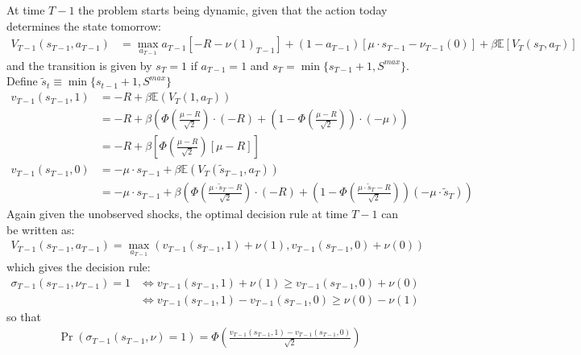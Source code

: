 \documentclass[english,letter,11pt,twoside]{article}
\begin{document}
At time $T-1$ the problem starts being dynamic, given that the action today determines the state tomorrow:
\begin{align*}
V_{T-1}(s_{T-1},a_{T-1}) &= \max_{a_{T-1}} a_{T-1}\left[ - R - \nu(1)_{T-1} \right] + (1 - a_{T-1}) \left[ \mu \cdot s_{T-1} - \nu_{T-1}(0) \right] + \beta \mathbb{E} \left[ V_T(s_T,a_T) \right]
\end{align*}
and the transition is given by $s_T = 1$ if $a_{T-1} = 1$ and $s_T = \min \{ s_{T-1}+1,S^{max}\}$.
Define $\tilde{s}_t \equiv \min \{ s_{t-1}+1,S^{max}\}$
\begin{align*}
v_{T-1}(s_{T-1},1) &= - R + \beta \mathbb{E} \left( V_T(1,a_T) \right) \\
&= - R + \beta \left( \Phi \left( \frac{\mu - R}{\sqrt{2}} \right)\cdot(-R) + \left(1 - \Phi \left( \frac{\mu - R}{\sqrt{2}} \right) \right) \cdot (-\mu ) \right)\\
&= - R + \beta \left[ \Phi \left( \frac{\mu - R}{\sqrt{2}} \right)\left[ \mu  - R \right] \right] \\
v_{T-1}(s_{T-1},0) &= -\mu \cdot s_{T-1} + \beta \mathbb{E} \left( V_T(\tilde{s}_{T-1},a_T) \right) \\
&= - \mu \cdot s_{T-1} + \beta \left( \Phi \left( \frac{\mu \cdot \tilde{s}_{T} - R}{\sqrt{2}} \right) \cdot (-R) + \left( 1 - \Phi \left( \frac{\mu \cdot \tilde{s}_{T}-R}{\sqrt{2}} \right)\right)(-\mu \cdot\tilde{s}_{T})\right)
\end{align*}
Again given the unobserved shocks, the optimal decision rule at time $T-1$ can be written as:
\begin{align*}
V_{T-1} (s_{T-1},a_{T-1}) = \max_{a_{T-1}} \left( v_{T-1} (s_{T-1},1) + \nu(1) ,v_{T-1}(s_{T-1},0) + \nu(0) \right)
\end{align*}
which gives the decision rule:
\begin{align*}
\sigma_{T-1}(s_{T-1},\nu_{T-1}) = 1 & \iff v_{T-1} (s_{T-1},1) + \nu(1) \geq v_{T-1}(s_{T-1},0) + \nu(0)\\
& \iff v_{T-1} (s_{T-1},1) - v_{T-1} (s_{T-1},0) \geq \nu(0) - \nu(1)
\end{align*}
so that
\begin{align*}
\Pr \left( \sigma_{T-1}(s_{T-1},\nu) = 1 \right) = \Phi \left( \frac{v_{T-1} (s_{T-1},1) - v_{T-1} (s_{T-1},0)}{\sqrt{2}} \right)
\end{align*}
\end{document}
